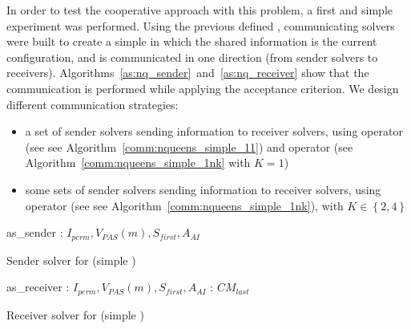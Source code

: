 \separation

In order to test the cooperative approach with this problem, a first and simple experiment was performed. Using the previous defined \as{}, communicating solvers were built to create a simple \commstr{} in which the shared information is the current configuration, and is communicated in one direction (from sender solvers to receivers). Algorithms~\ref{as:nq_sender}~and~\ref{as:nq_receiver} show that the communication is performed while applying the acceptance criterion. We design different communication strategies: 
\begin{itemize}
\item a set of sender solvers sending information to receiver solvers, using operator \oneTone{} (see see Algorithm~\ref{comm:nqueens_simple_11}) and operator \oneTn{} (see Algorithm~\ref{comm:nqueens_simple_1nk} with $K=1$)
\item some sets of sender solvers sending information to receiver solvers, using operator \oneTn{} (see see Algorithm~\ref{comm:nqueens_simple_1nk}), with $K\in\left\{2, 4\right\}$
\end{itemize}

\begin{algorithm}[h]
\dontprintsemicolon
\SetNoline
{}
   as\_sender\;
\algoindent {} : $I_{perm}, V_{PAS}(m), S_{first}, A_{AI}$ \;
\caption{Sender solver for \NQP{} (simple \commstr)}\label{as:nq_sender}
\end{algorithm}

\begin{algorithm}[h]
\dontprintsemicolon
\SetNoline
{}
   as\_receiver\;
\algoindent {} : $I_{perm}, V_{PAS}(m), S_{first}, A_{AI}$ \;
\algoindent {}: $CM_{last}$\;
\caption{Receiver solver for \NQP{} (simple \commstr)}\label{as:nq_receiver}
\end{algorithm}

